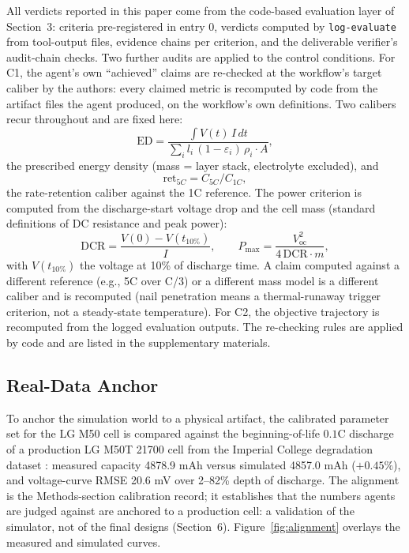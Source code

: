 All verdicts reported in this paper come from the code-based evaluation
layer of Section~3: criteria pre-registered in entry 0, verdicts computed
by \texttt{log-evaluate} from tool-output files, evidence chains per
criterion, and the deliverable verifier's audit-chain checks. Two further
audits are applied to the control conditions. For C1, the agent's own
``achieved'' claims are re-checked at the workflow's target caliber by
the authors: every claimed metric is recomputed by code from the
artifact files the agent produced, on the workflow's own definitions. Two calibers recur throughout and are fixed here:
\begin{equation}
\label{eq:ed}
\mathrm{ED} = \frac{\int V(t)\, I\, dt}{\sum_i l_i\,(1-\varepsilon_i)\,\rho_i \cdot A},
\end{equation}
the prescribed energy density (mass = layer stack, electrolyte
excluded), and
\begin{equation}
\label{eq:ret}
\mathrm{ret}_{5C} = C_{5C}/C_{1C},
\end{equation}
the rate-retention caliber against the 1C reference. The power criterion is
computed from the discharge-start voltage drop and the cell mass (standard
definitions of DC resistance and peak power):
\begin{equation}
\label{eq:power}
\mathrm{DCR} = \frac{V(0) - V(t_{10\%})}{I},
\qquad
P_{\max} = \frac{V_{\mathrm{oc}}^2}{4\,\mathrm{DCR}\cdot m},
\end{equation}
with $V(t_{10\%})$ the voltage at 10\% of discharge time. A claim computed
against a different reference (e.g., 5C over C/3) or a different mass model
is a different caliber and is recomputed (nail penetration means a
thermal-runaway trigger criterion, not a steady-state temperature). For C2, the objective trajectory
is recomputed from the logged evaluation outputs. The re-checking rules
are applied by code and are listed in the supplementary materials.

\subsection{Real-Data Anchor}

To anchor the simulation world to a physical artifact, the calibrated
parameter set for the LG M50 cell \cite{oregan2022electrochim} is compared
against the beginning-of-life $0.1$C discharge of a production LG M50T
21700 cell from the Imperial College degradation dataset
\cite{lgm50dataset2024, kirkaldy2024lgm50}: measured capacity 4878.9 mAh
versus simulated 4857.0 mAh ($+0.45\%$), and voltage-curve RMSE 20.6 mV
over 2--82\% depth of discharge. The alignment is the Methods-section
calibration record; it establishes that the numbers agents are judged
against are anchored to a production cell: a validation of the simulator,
not of the final designs (Section~6). Figure~\ref{fig:alignment} overlays
the measured and simulated curves.

